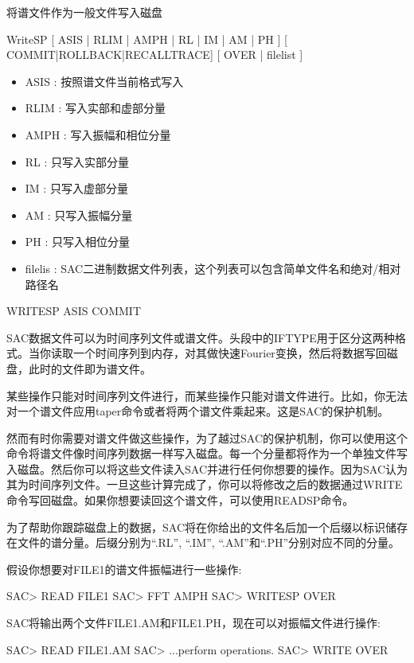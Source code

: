 \label{cmd:writesp}

将谱文件作为一般文件写入磁盘

WriteSP [ ASIS | RLIM | AMPH | RL | IM | AM | PH ] [ COMMIT|ROLLBACK|RECALLTRACE]  [ OVER | filelist ]
 
\begin{itemize}
\item ASIS :  按照谱文件当前格式写入 
\item RLIM :  写入实部和虚部分量 
\item AMPH :  写入振幅和相位分量 
\item RL :  只写入实部分量 
\item IM :  只写入虚部分量 
\item AM :  只写入振幅分量 
\item PH :  只写入相位分量 
\item filelis :  SAC二进制数据文件列表，这个列表可以包含简单文件名和绝对/相对路径名
\end{itemize}

WRITESP ASIS COMMIT

SAC数据文件可以为时间序列文件或谱文件。头段中的IFTYPE用于区分这两种格式。当你读取一个时间序列到内存，对其做快速Fourier变换，然后将数据写回磁盘，此时的文件即为谱文件。

某些操作只能对时间序列文件进行，而某些操作只能对谱文件进行。比如，你无法对一个谱文件应用taper命令或者将两个谱文件乘起来。这是SAC的保护机制。

然而有时你需要对谱文件做这些操作，为了越过SAC的保护机制，你可以使用这个命令将谱文件像时间序列数据一样写入磁盘。每一个分量都将作为一个单独文件写入磁盘。然后你可以将这些文件读入SAC并进行任何你想要的操作。因为SAC认为其为时间序列文件。一旦这些计算完成了，你可以将修改之后的数据通过WRITE命令写回磁盘。如果你想要读回这个谱文件，可以使用READSP命令。

为了帮助你跟踪磁盘上的数据，SAC将在你给出的文件名后加一个后缀以标识储存在文件的谱分量。后缀分别为``.RL'', ``.IM'', ``.AM''和``.PH''分别对应不同的分量。

假设你想要对FILE1的谱文件振幅进行一些操作:
\begin{SACCode}
SAC> READ FILE1
SAC> FFT AMPH
SAC> WRITESP OVER
\end{SACCode}

SAC将输出两个文件FILE1.AM和FILE1.PH，现在可以对振幅文件进行操作:
\begin{SACCode}
SAC> READ FILE1.AM
SAC> ...perform operations.
SAC> WRITE OVER
\end{SACCode}

